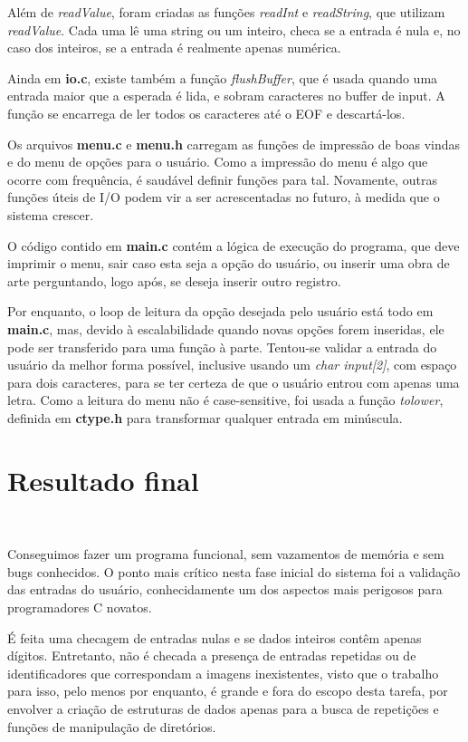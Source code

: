 \documentclass{article}
\begin{document}
Além de \textit{readValue}, foram criadas as funções \textit{readInt} e \textit{readString}, que utilizam \textit{readValue}. Cada uma lê uma string ou um inteiro, checa se a entrada é nula e, no caso dos inteiros, se a entrada é realmente apenas numérica.

Ainda em \textbf{io.c}, existe também a função \textit{flushBuffer}, que é usada quando uma entrada maior que a esperada é lida, e sobram caracteres no buffer de input. A função se encarrega de ler todos os caracteres até o EOF e descartá-los.

Os arquivos \textbf{menu.c} e \textbf{menu.h} carregam as funções de impressão de boas vindas e do menu de opções para o usuário. Como a impressão do menu é algo que ocorre com frequência, é saudável definir funções para tal. Novamente, outras funções úteis de I/O podem vir a ser acrescentadas no futuro, à medida que o sistema crescer.

O código contido em \textbf{main.c} contém a lógica de execução do programa, que deve imprimir o menu, sair caso esta seja a opção do usuário, ou inserir uma obra de arte perguntando, logo após, se deseja inserir outro registro.

Por enquanto, o loop de leitura da opção desejada pelo usuário está todo em \textbf{main.c}, mas, devido à escalabilidade quando novas opções forem inseridas, ele pode ser transferido para uma função à parte. Tentou-se validar a entrada do usuário da melhor forma possível, inclusive usando um \textit{char input[2]}, com espaço para dois caracteres, para se ter certeza de que o usuário entrou com apenas uma letra. Como a leitura do menu não é case-sensitive, foi usada a função \textit{tolower}, definida em \textbf{ctype.h} para transformar qualquer entrada em minúscula.

\section*{Resultado final}\

Conseguimos fazer um programa funcional, sem vazamentos de memória e sem bugs conhecidos. O ponto mais crítico nesta fase inicial do sistema foi a validação das entradas do usuário, conhecidamente um dos aspectos mais perigosos para programadores C novatos.

É feita uma checagem de entradas nulas e se dados inteiros contêm apenas dígitos. Entretanto, não é checada a presença de entradas repetidas ou de identificadores que correspondam a imagens inexistentes, visto que o trabalho para isso, pelo menos por enquanto, é grande e fora do escopo desta tarefa, por envolver a criação de estruturas de dados apenas para a busca de repetições e funções de manipulação de diretórios.
\end{document}

